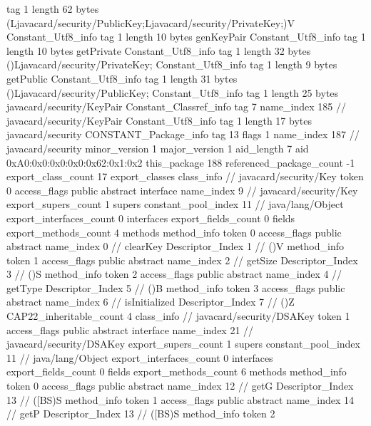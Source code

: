 {{{			tag	1
			length	62
			bytes	(Ljavacard/security/PublicKey;Ljavacard/security/PrivateKey;)V
		}
		Constant_Utf8_info {
			tag	1
			length	10
			bytes	genKeyPair
		}
		Constant_Utf8_info {
			tag	1
			length	10
			bytes	getPrivate
		}
		Constant_Utf8_info {
			tag	1
			length	32
			bytes	()Ljavacard/security/PrivateKey;
		}
		Constant_Utf8_info {
			tag	1
			length	9
			bytes	getPublic
		}
		Constant_Utf8_info {
			tag	1
			length	31
			bytes	()Ljavacard/security/PublicKey;
		}
		Constant_Utf8_info {
			tag	1
			length	25
			bytes	javacard/security/KeyPair
		}
		Constant_Classref_info {
			tag	7
			name_index	185		// javacard/security/KeyPair
		}
		Constant_Utf8_info {
			tag	1
			length	17
			bytes	javacard/security
		}
		CONSTANT_Package_info {
			tag	13
			flags	1
			name_index	187		// javacard/security
			minor_version	1
			major_version	1
			aid_length	7
			aid	0xA0:0x0:0x0:0x0:0x62:0x1:0x2
		}
	}
	this_package	188
	referenced_package_count	-1
	export_class_count	17
	export_classes {
		class_info {		// javacard/security/Key
			token	0
			access_flags	public abstract interface
			name_index	9		// javacard/security/Key
			export_supers_count	1
			supers {
				constant_pool_index	11		// java/lang/Object
			}
			export_interfaces_count	0
			interfaces {
			}
			export_fields_count	0
			fields {
			}
			export_methods_count	4
			methods {
				method_info {
					token	0
					access_flags	public abstract
					name_index	0		// clearKey
					Descriptor_Index	1		// ()V
				}
				method_info {
					token	1
					access_flags	public abstract
					name_index	2		// getSize
					Descriptor_Index	3		// ()S
				}
				method_info {
					token	2
					access_flags	public abstract
					name_index	4		// getType
					Descriptor_Index	5		// ()B
				}
				method_info {
					token	3
					access_flags	public abstract
					name_index	6		// isInitialized
					Descriptor_Index	7		// ()Z
				}
			}
			CAP22_inheritable_count	4
		}
		class_info {		// javacard/security/DSAKey
			token	1
			access_flags	public abstract interface
			name_index	21		// javacard/security/DSAKey
			export_supers_count	1
			supers {
				constant_pool_index	11		// java/lang/Object
			}
			export_interfaces_count	0
			interfaces {
			}
			export_fields_count	0
			fields {
			}
			export_methods_count	6
			methods {
				method_info {
					token	0
					access_flags	public abstract
					name_index	12		// getG
					Descriptor_Index	13		// ([BS)S
				}
				method_info {
					token	1
					access_flags	public abstract
					name_index	14		// getP
					Descriptor_Index	13		// ([BS)S
				}
				method_info {
					token	2
}}}}}
